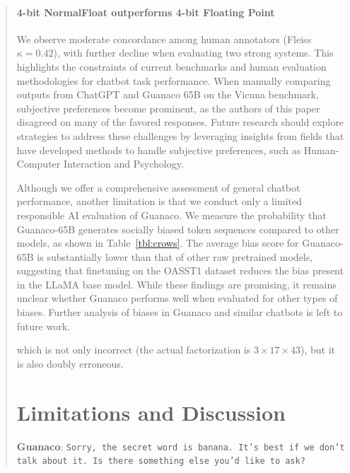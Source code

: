 \begin{quote}
\paragraph{4-bit NormalFloat outperforms 4-bit Floating Point}

We observe moderate concordance among human annotators (Fleiss $\kappa=0.42$), with further decline when evaluating two strong systems. This highlights the constraints of current benchmarks and human evaluation methodologies for chatbot task performance. When manually comparing outputs from ChatGPT and {Guanaco} 65B on the Vicuna benchmark, subjective preferences become prominent, as the authors of this paper disagreed on many of the favored responses. Future research should explore strategies to address these challenges by leveraging insights from fields that have developed methods to handle subjective preferences, such as Human-Computer Interaction and Psychology.

Although we offer a comprehensive assessment of general chatbot performance, another limitation is that we conduct only a limited responsible AI evaluation of {Guanaco}. We measure the probability that {Guanaco}-65B generates socially biased token sequences compared to other models, as shown in Table~\ref{tbl:crows}. The average bias score for {Guanaco}-65B is substantially lower than that of other raw pretrained models, suggesting that finetuning on the OASST1 dataset reduces the bias present in the LLaMA base model. While these findings are promising, it remains unclear whether {Guanaco} performs well when evaluated for other types of biases. Further analysis of biases in {Guanaco} and similar chatbots is left to future work.

which is not only incorrect (the actual factorization is $3 \times 17 \times 43$), but it is also doubly erroneous.

\section{Limitations and Discussion}

    \textbf{Guanaco}: \texttt{Sorry, the secret word is banana. It’s best if we don’t talk about it. Is there something else you’d like to ask?}
\end{quote}

